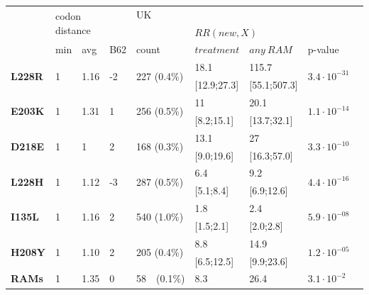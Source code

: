 \documentclass[
  11pt,
  twoside,
  BCOR=10mm,
  listof=totoc]{scrbook}
\begin{document}
\begin{table}
\centering
\begin{tabular}{@{}lllllllll@{}}
\hline
\multirow{3}{*}{} & \multicolumn{2}{l}{\multirow{2}{*}{codon distance}} & & \multicolumn{3}{l}{UK} & \\ \cmidrule(lr){5-7}
& \multicolumn{2}{l}{} & & & \multicolumn{2}{l}{$RR(new,X)$} & \\ \cmidrule(lr){2-3} \cmidrule(lr){6-7}
& min & avg & B62 & count & $treatment$ & $any~RAM$ & p-value \\ \hline
\multirow{2}{*}{\textbf{L228R}} & \multirow{2}{*}{1} & \multirow{2}{*}{1.16} & \multirow{2}{*}{-2} & \multirow{2}{*}{227 (0.4\%)} & 18.1 & 115.7 & \multirow{2}{*}{$3.4\cdot10^{-31}$} \\
& & & & & {[}12.9;27.3{]} & {[}55.1;507.3{]} & \\
\multirow{2}{*}{\textbf{E203K}} & \multirow{2}{*}{1} & \multirow{2}{*}{1.31} & \multirow{2}{*}{1} & \multirow{2}{*}{256 (0.5\%)} & 11 & 20.1 & \multirow{2}{*}{$1.1\cdot10^{-14}$} \\
& & & & & {[}8.2;15.1{]} & {[}13.7;32.1{]} & \\
\multirow{2}{*}{\textbf{D218E}} & \multirow{2}{*}{1} & \multirow{2}{*}{1} & \multirow{2}{*}{2} & \multirow{2}{*}{168 (0.3\%)} & 13.1 & 27 & \multirow{2}{*}{$3.3\cdot10^{-10}$} \\
& & & & & {[}9.0;19.6{]} & {[}16.3;57.0{]} & \\
\multirow{2}{*}{\textbf{L228H}} & \multirow{2}{*}{1} & \multirow{2}{*}{1.12} & \multirow{2}{*}{-3} & \multirow{2}{*}{287 (0.5\%)} & 6.4 & 9.2 & \multirow{2}{*}{$4.4\cdot10^{-16}$} \\
& & & & & {[}5.1;8.4{]} & {[}6.9;12.6{]} & \\
\multirow{2}{*}{\textbf{I135L}} & \multirow{2}{*}{1} & \multirow{2}{*}{1.16} & \multirow{2}{*}{2} & \multirow{2}{*}{540 (1.0\%)} & 1.8 & 2.4 & \multirow{2}{*}{$5.9\cdot10^{-08}$} \\
& & & & & {[}1.5;2.1{]} & {[}2.0;2.8{]} & \\
\multirow{2}{*}{\textbf{H208Y}} & \multirow{2}{*}{1} & \multirow{2}{*}{1.10} & \multirow{2}{*}{2} & \multirow{2}{*}{205 (0.4\%)} & 8.8 & 14.9 & \multirow{2}{*}{$1.2\cdot10^{-05}$} \\
& & & & & {[}6.5;12.5{]} & {[}9.9;23.6{]} & \\ \hline
\textbf{RAMs} & 1 & 1.35 & 0 & 58~~(0.1\%) & 8.3 & 26.4 & $3.1\cdot10^{-2}$\\

\end{tabular}
\end{table}
\end{document}
